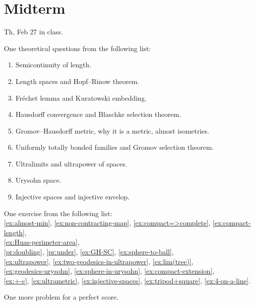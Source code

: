 \chapter{Midterm}\label{chap:midterm}

Th, Feb 27 in class.

\bigskip

\noi 
One theoretical questions from the following list:

\begin{enumerate}
\item 
Semicontinuity of length.
\item
Length spaces and Hopf--Rinow theorem.
\item
Fréchet lemma and Kuratowski embedding.
\item
Hausdorff convergence and Blaschke selection theorem.
\item
Gromov--Hausdorff metric, why it is a metric, almost isometries.
\item
Uniformly totally bonded families and Gromov selection theorem.
\item
Ultralimits and ultrapower of spaces.
\item
Urysohn space.
\item
Injective spaces and injective envelop.
\end{enumerate}

\bigskip

\noi One exercise from the following list:
\\
\ref{ex:almost-min},
\ref{ex:non-contracting-map},
\ref{ex:compact=>complete},
\ref{ex:compact-length},
\\
\ref{ex:Huas-perimeter-area},
\\
\ref{pr:doubling},
\ref{pr:under},
\ref{ex:GH-SC},
\ref{ex:sphere-to-ball},
\\
\ref{ex:ultrapower}, 
\ref{ex:two-geodesics-in-ultrapower},
\ref{ex:lim(tree)},
\\
\ref{ex:geodesics-urysohn},
\ref{ex:sphere-in-urysohn},
\ref{ex:compact-extension},
\\
\ref{ex:+-c},
\ref{ex:ultrametric},
\ref{ex:injective-spaces},
\ref{ex:tripod+square},
\ref{ex:4-on-a-line}.

\bigskip

\noi One more problem for a perfect score.
